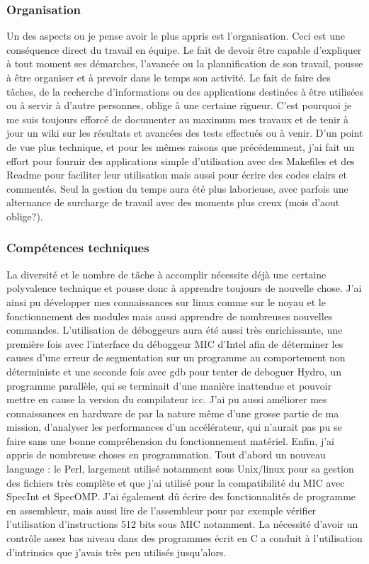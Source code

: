 \documentclass[11pt]{article}
\begin{document}
			\subsubsection{Organisation}
			Un des aspects ou je pense avoir le plus appris est l'organisation. Ceci est une conséquence direct du travail 
			en équipe. Le fait de devoir être capable d'expliquer à tout moment ses démarches, l'avancée ou la plannification 
			de son travail, pousse à être organiser et à prevoir dans le temps son activité. Le fait de faire des tâches, de la 
			recherche d'informations ou des applications destinées à être utilisées ou à servir à d'autre personnes, oblige à une 
			certaine rigueur. C'est pourquoi je me suis toujours efforcé de documenter au maximum mes travaux et de tenir à jour 
			un wiki sur les résultats et avancées des tests effectués ou à venir. \newline
			D'un point de vue plus technique, et pour les mêmes raisons que précédemment, j'ai fait un effort pour fournir 
			des applications simple d'utilisation avec des Makefiles et des Readme pour faciliter leur utilisation mais aussi 
			pour écrire des codes clairs et commentés. \newline
			Seul la gestion du temps aura été plus laborieuse, avec parfois une alternance de surcharge de travail avec des moments 
			plus creux (mois d'aout oblige?).
			\subsubsection{Compétences techniques}
			La diversité et le nombre de tâche à accomplir nécessite déjà une certaine polyvalence technique et pousse donc à 
			apprendre toujours de nouvelle chose. J'ai ainsi pu développer mes connaissances sur linux comme sur le noyau et 
			le fonctionnement des modules mais aussi apprendre de nombreuses nouvelles commandes. \newline
			L'utilisation de déboggeurs aura été aussi très enrichissante, une première fois avec l'interface du déboggeur 
			MIC d'Intel afin de déterminer les causes d'une erreur de segmentation sur un programme au comportement non 
			déterministe et une seconde fois avec gdb pour tenter de deboguer Hydro, un programme parallèle, qui se terminait 
			d'une manière inattendue et pouvoir mettre en cause la version du compilateur icc. \newline
			J'ai pu aussi améliorer mes connaissances en hardware de par la nature même d'une grosse partie de ma mission, d'analyser 
			les performances d'un accélérateur, qui n'aurait pas pu se faire sans une bonne compréhension du fonctionnement matériel. \newline
			Enfin, j'ai appris de nombreuse choses en programmation. Tout d'abord un nouveau language : le Perl, largement utilisé 
			notamment sous Unix/linux pour sa gestion des fichiers très complète et que j'ai utilisé pour la compatibilité du MIC 
			avec SpecInt et SpecOMP. J'ai également dû écrire des fonctionnalités de programme en assembleur, mais aussi lire 
			de l'assembleur pour par exemple vérifier l'utilisation d'instructions 512 bits sous MIC notamment. La nécessité 
			d'avoir un contrôle assez bas niveau dans des programmes écrit en C a conduit à l'utilisation d'intrinsics que j'avais 
			très peu utilisés jusqu'alors.
\end{document}
